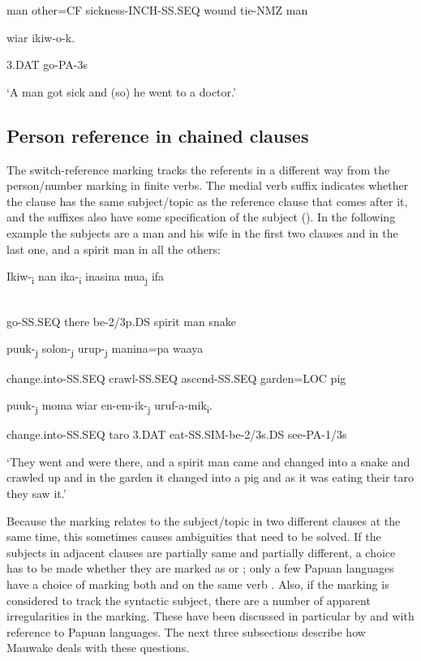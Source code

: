 man  other=CF  sickness-INCH-SS.SEQ  wound  tie-NMZ  man

wiar  ikiw-o-k.

3.DAT  go-PA-3s

`A man got sick and (so) he went to a doctor.'

\subsection{Person reference in chained clauses}
\hypertarget{RefHeading23161935131865}{}
The switch-reference marking tracks the referents in a different way from the person/number marking in finite verbs. The medial verb suffix indicates whether the clause has the same subject/topic as the reference clause that comes after it, and the  suffixes also have some specification of the subject (). In the following example the subjects are a man and his wife in the first two clauses and in the last one, and a spirit man in all the others:

\ea%
\label{ex:x1436}
\gll Ikiw-\textsubscript{i}  nan  ika-\textsubscript{i}  inasina  mua\textsubscript{j}  ifa  \\
      \\
\glt
\z

go-SS.SEQ  there  be-2/3p.DS  spirit  man  snake

puuk-\textsubscript{j}  solon-\textsubscript{j}  urup-\textsubscript{j}  manina=pa  waaya

change.into-SS.SEQ  crawl-SS.SEQ  ascend-SS.SEQ  garden=LOC  pig

puuk-\textsubscript{j}  moma  wiar  en-em-ik-\textsubscript{j}  uruf-a-mik\textsubscript{i}.

change.into-SS.SEQ  taro  3.DAT  eat-SS.SIM-be-2/3s.DS  see-PA-1/3s

`They went and were there, and a spirit man came and changed into a snake and crawled up and in the garden it changed into a pig and as it was eating their taro they saw it.'

Because the  marking relates to the subject/topic in two different clauses at the same time, this sometimes causes ambiguities that need to be solved. If the subjects in adjacent clauses are partially same and partially different, a choice has to be made whether they are marked as  or ; only a few Papuan languages have a choice of marking both  and  on the same verb \citep{Roberts1997}. Also, if the  marking is considered to track the syntactic subject, there are a number of apparent irregularities in the marking. These have been discussed in particular by \citet{Reesink1983a} and \citet{Roberts1988b} with reference to Papuan languages. The next three subsections describe how Mauwake deals with these questions. 

